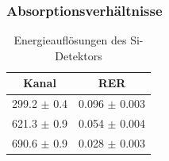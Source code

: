 \subsubsection{Absorptionsverhältnisse}
\begin{table}[H]
\begin{center}
\begin{tabular}{|c|c|}
\hline 
Kanal & RER \\ \hline
299.2 $\pm$ 0.4 & 0.096 $\pm$ 0.003 \\ \hline
621.3 $\pm$ 0.9 & 0.054 $\pm$ 0.004 \\ \hline
690.6 $\pm$ 0.9 & 0.028 $\pm$ 0.003 \\ \hline
\end{tabular}
\caption{Energieauflösungen des Si-Detektors}
\label{tab:si:rer}
\end{center}
\end{table}
